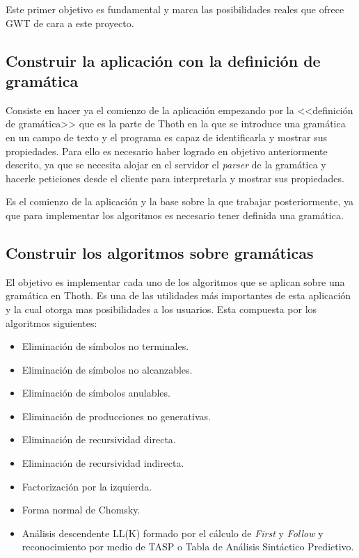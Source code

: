 Este primer objetivo es fundamental y marca las posibilidades reales que ofrece GWT de cara a este proyecto.

\subsection{Construir la aplicación con la definición de gramática}

Consiste en hacer ya el comienzo de la aplicación empezando por la <<definición de gramática>> que es la parte de Thoth en la que se introduce una gramática en un campo de texto y el programa es capaz de identificarla y mostrar sus propiedades. Para ello es necesario haber logrado en objetivo anteriormente descrito, ya que se necesita alojar en el servidor el \emph{parser} de la gramática y hacerle peticiones desde el cliente para interpretarla y mostrar sus propiedades.

Es el comienzo de la aplicación y la base sobre la que trabajar posteriormente, ya que para implementar los algoritmos es necesario tener definida una gramática.

\subsection{Construir los algoritmos sobre gramáticas}

El objetivo es implementar cada uno de los algoritmos que se aplican sobre una gramática en Thoth. Es una de las utilidades más importantes de esta aplicación y la cual otorga mas posibilidades a los usuarios. Esta compuesta por los algoritmos siguientes:

\begin{itemize}
\item Eliminación de símbolos no terminales.
\item Eliminación de símbolos no alcanzables. 
\item Eliminación de símbolos anulables.
\item Eliminación de producciones no generativas.
\item Eliminación de recursividad directa.
\item Eliminación de recursividad indirecta.
\item Factorización por la izquierda.
\item Forma normal de Chomsky.
\item Análisis descendente LL(K) formado por el cálculo de \emph{First} y \emph{Follow} y reconocimiento por medio de TASP o Tabla de Análisis Sintáctico Predictivo.
\end{itemize}

